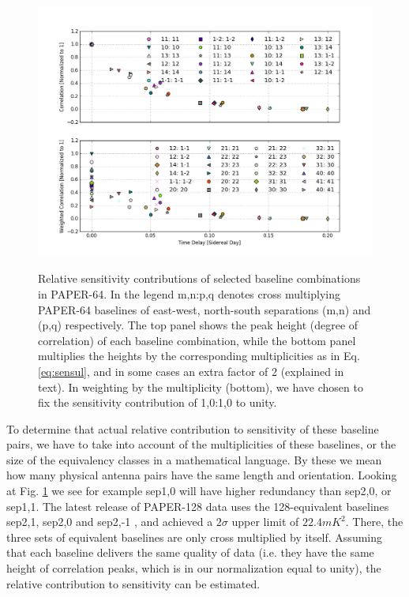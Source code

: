 \documentclass[preprint2,numberedappendix,tighten,twocolappendix]{aastex6}  %
\renewcommand\[{\begin{equation}}
\renewcommand\]{\end{equation}}
\begin{document}
\begin{figure}[H]
\includegraphics[width=\linewidth]{sensitivity}
\label{fig:sensplot}
\caption{Relative sensitivity contributions of selected baseline combinations in PAPER-64. In the legend m,n:p,q denotes cross
multiplying PAPER-64 baselines of east-west, north-south separations (m,n) and (p,q) respectively. The top
panel shows the peak height (degree of correlation) of each baseline
combination, while the bottom panel multiplies the heights by the
corresponding multiplicities as in Eq. \eqref{eq:sensul}, and in some cases an extra factor of 2 (explained in text). 
In weighting by the multiplicity (bottom), we have chosen to fix the sensitivity 
contribution of 1,0:1,0 to unity. }


\end{figure}


To determine that actual relative contribution to sensitivity of these
baseline pairs, we have to take into account of the multiplicities of
these baselines, or the size of the equivalency classes in a mathematical
language. By these we mean how many physical antenna pairs have the
same length and orientation. Looking at Fig. \ref{fig:sensplot}
we see for example sep1,0 will have higher redundancy than sep2,0,
or sep1,1. The latest release of PAPER-128 data uses the 128-equivalent baselines sep2,1,
sep2,0 and sep2,-1 \cite{Ali2015}, and achieved a $2\sigma$ upper
limit of $22.4mK^{2}$. There, the three sets of equivalent baselines
are only cross multiplied by itself. Assuming that each baseline delivers
the same quality of data (i.e. they have the same height of correlation
peaks, which is in our normalization equal to unity), the relative
contribution to sensitivity can be estimated. 
\end{document}
